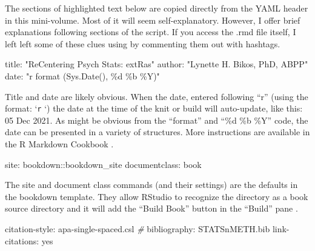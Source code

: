 \documentclass[
]{book}
\newenvironment{Shaded}{\begin{snugshade}}{\end{snugshade}}
\newcommand{\CommentTok}[1]{\textcolor[rgb]{0.56,0.35,0.01}{\textit{#1}}}
\newcommand{\NormalTok}[1]{#1}
\newcommand{\SpecialCharTok}[1]{\textcolor[rgb]{0.00,0.00,0.00}{#1}}
\newcommand{\StringTok}[1]{\textcolor[rgb]{0.31,0.60,0.02}{#1}}
\begin{document}
The sections of highlighted text below are copied directly from the YAML header in this mini-volume. Most of it will seem self-explanatory. However, I offer brief explanations following sections of the script. If you access the .rmd file itself, I left left some of these clues using by commenting them out with hashtags.

\begin{Shaded}
\begin{Highlighting}[]
\NormalTok{title}\SpecialCharTok{:} \StringTok{"ReCentering Psych Stats: extRas"}
\NormalTok{author}\SpecialCharTok{:} \StringTok{"Lynette H. Bikos, PhD, ABPP"}
\NormalTok{date}\SpecialCharTok{:} \StringTok{"\textasciigrave{}r format (Sys.Date(), \textquotesingle{}\%d \%b \%Y\textquotesingle{})\textasciigrave{}"}
\end{Highlighting}
\end{Shaded}

Title and date are likely obvious. When the date, entered following ``r'' (using the format: `\texttt{r} `) the date at the time of the knit or build will auto-update, like this: 05 Dec 2021. As might be obvious from the ``format'' and ``\%d \%b \%Y'' code, the date can be presented in a variety of structures. More instructions are available in the R Markdown Cookbook \citep{xie_r_2021}.

\begin{Shaded}
\begin{Highlighting}[]
\NormalTok{site}\SpecialCharTok{:}\NormalTok{ bookdown}\SpecialCharTok{::}\NormalTok{bookdown\_site}
\NormalTok{documentclass}\SpecialCharTok{:}\NormalTok{ book}
\end{Highlighting}
\end{Shaded}

The site and document class commands (and their settings) are the defaults in the bookdown template. They allow RStudio to recognize the directory as a book source directory and it will add the ``Build Book'' button in the ``Build'' pane \citep{xie_r_2021}.

\begin{Shaded}
\begin{Highlighting}[]
\NormalTok{citation}\SpecialCharTok{{-}}\NormalTok{style}\SpecialCharTok{:}\NormalTok{ apa}\SpecialCharTok{{-}}\NormalTok{single}\SpecialCharTok{{-}}\NormalTok{spaced.csl }\CommentTok{\#}
\NormalTok{bibliography}\SpecialCharTok{:}\NormalTok{ STATSnMETH.bib }
\NormalTok{link}\SpecialCharTok{{-}}\NormalTok{citations}\SpecialCharTok{:}\NormalTok{ yes}
\end{Highlighting}
\end{Shaded}
\end{document}
